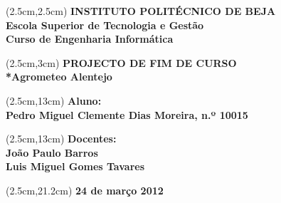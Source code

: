 \thispagestyle{empty}
\begin{titlepage}
  \vspace*{2cm}
  \baselineskip=24pt

\fontsize{20}{30}
  \textblockorigin{0cm}{0cm}
  \begin{textblock*}{16cm}(2.5cm,2.5cm)
    \centering
    \textbf{{INSTITUTO POLITÉCNICO DE BEJA
\\Escola Superior de Tecnologia e Gestão
\\Curso de Engenharia Informática}}
  \end{textblock*}

   \textblockorigin{0cm}{9cm}
   \begin{textblock*}{16cm}(2.5cm,3cm)
     \centering
{}	
\fontsize{24}{30}
       \textbf{{PROJECTO DE FIM DE CURSO
\\*Agrometeo Alentejo }}
   \end{textblock*}







   \textblockorigin{0cm}{7cm}
   \begin{textblock*}{16cm}(2.5cm,13cm)
     \centering
{}	
\fontsize{16}{20}
       \textbf{{ Aluno: 
\\Pedro Miguel Clemente Dias Moreira, n.º 10015}}
   \end{textblock*}

   \textblockorigin{0cm}{9cm}
   \begin{textblock*}{16cm}(2.5cm,13cm)
     \centering
{}	
\fontsize{16}{20}
       \textbf{{Docentes:
\\João Paulo Barros
\\Luis Miguel Gomes Tavares}}
   \end{textblock*}

   \textblockorigin{0cm}{5cm}
   \begin{textblock*}{16cm}(2.5cm,21.2cm)
     \centering
{}	
\fontsize{12}{20}
       \textbf{24 de março 2012}
   \end{textblock*}
   
\end{titlepage}
